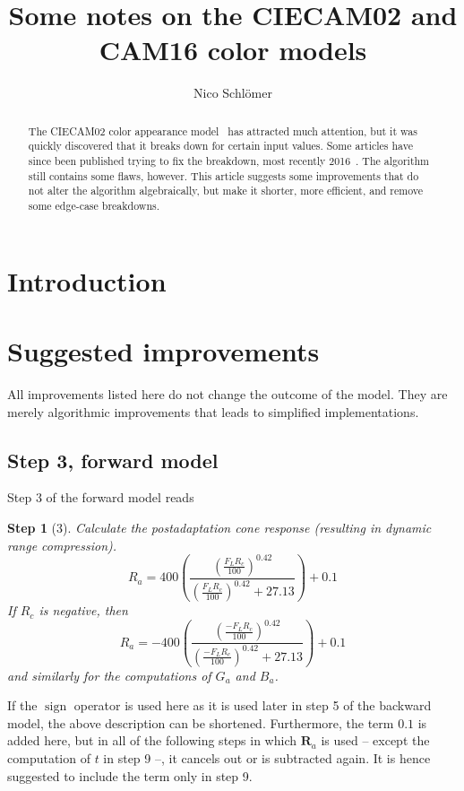 \documentclass[twocolumn]{scrartcl}
\title{Some notes on the CIECAM02 and CAM16 color models}
\author{Nico Schlömer}
\theoremstyle{named}
\newtheorem*{step}{Step}
\DeclareMathOperator{\sign}{sign}
\newcommand\rgb{\bm{R}}
\begin{document}
\maketitle
\begin{abstract}
  The CIECAM02 color appearance model~\cite{ciecam02} has attracted much
  attention, but it was quickly discovered that it breaks down for certain
  input values. Some articles have since been published trying to fix the
  breakdown, most recently 2016~\cite{cam16}. The algorithm still contains some
  flaws, however. This article suggests some improvements that do not alter the
  algorithm algebraically, but make it shorter, more efficient, and remove some
  edge-case breakdowns.
\end{abstract}

\section{Introduction}



\section{Suggested improvements}

All improvements listed here do not change the outcome of the model.  They are
merely algorithmic improvements that leads to simplified implementations.

\subsection{Step 3, forward model}

Step 3 of the forward model reads

\begin{step}[3]
Calculate the postadaptation cone response
(resulting in dynamic range compression).
\[
  R_a = 400 \left(\frac{\left(\frac{F_L R_c}{100}\right)^{0.42}}{\left(\frac{F_L R_c}{100}\right)^{0.42} + 27.13}\right) + 0.1
\]
If $R_c$ is negative, then
\[
  R_a = -400 \left(\frac{\left(\frac{-F_L R_c}{100}\right)^{0.42}}{\left(\frac{-F_L R_c}{100}\right)^{0.42} + 27.13}\right) + 0.1
\]
and similarly for the computations of $G_a$ and $B_a$.
\end{step}

If the $\sign$ operator is used here as it is used later in step 5 of the
backward model, the above description can be shortened.
Furthermore, the term $0.1$ is added here, but in all of the following steps in
which $\rgb_a$ is used -- except the computation of $t$ in step 9 --, it
cancels out or is subtracted again. It is hence suggested to include the term
only in step 9.
\end{document}
